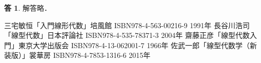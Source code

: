 \documentclass[dvipdfmx]{jsarticle}
\theoremstyle{definition}
\newtheorem{answer}{答}[section]
\begin{document}
\begin{answer}
    解答略．
\end{answer}



\begin{thebibliography}{9}
     三宅敏恒「入門線形代数」培風館 ISBN978-4-563-00216-9 1991年
     長谷川浩司「線型代数」日本評論社 ISBN978-4-535-78371-3 2004年
     齋藤正彦「線型代数入門」東京大学出版会 ISBN978-4-13-062001-7 1966年
     佐武一郎「線型代数学（新装版）」裳華房 ISBN978-4-7853-1316-6 2015年
\end{thebibliography}
\end{document}
